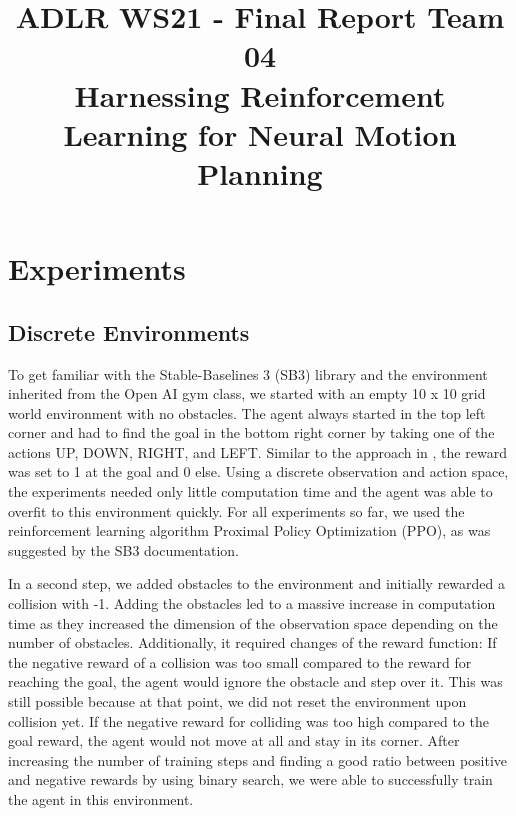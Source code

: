 \documentclass[conference]{IEEEtran}
\begin{document}
\title{ADLR WS21 - Final Report Team 04 \\ Harnessing Reinforcement Learning for Neural Motion Planning\\
}

\author{
\and
{}
}

\maketitle

\section{Experiments}

\subsection{Discrete Environments}

To get familiar with the Stable-Baselines 3 (SB3) library and the environment inherited from the Open AI gym class, we started with an empty 10 x 10 grid world environment with no obstacles. The agent always started in the top left corner and had to find the goal in the bottom right corner by taking one of the actions UP, DOWN, RIGHT, and LEFT. Similar to the approach in \cite{b1}, the reward was set to 1 at the goal and 0 else. Using a discrete observation and action space, the experiments needed only little computation time and the agent was able to overfit to this environment quickly. For all experiments so far, we used the reinforcement learning algorithm Proximal Policy Optimization (PPO), as was suggested by the SB3 documentation.

In a second step, we added obstacles to the environment and initially rewarded a collision with -1. Adding the obstacles led to a massive increase in computation time as they increased the dimension of the observation space depending on the number of obstacles. Additionally, it required changes of the reward function: If the negative reward of a collision was too small compared to the reward for reaching the goal, the agent would ignore the obstacle and step over it. This was still possible because at that point, we did not reset the environment upon collision yet. If the negative reward for colliding was too high compared to the goal reward, the agent would not move at all and stay in its corner. After increasing the number of training steps and finding a good ratio between positive and negative rewards by using binary search, we were able to successfully train the agent in this environment.
\end{document}
